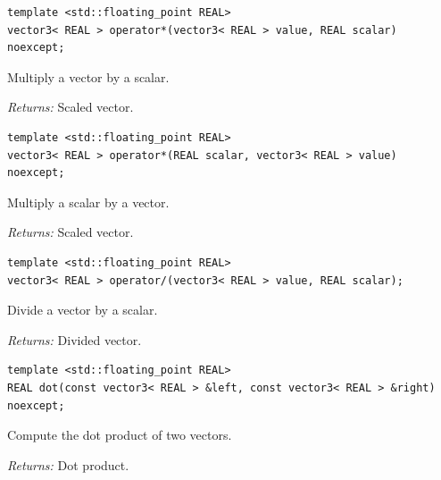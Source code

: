 \par\noindent\begin{minipage}{\linewidth}
\begin{lstlisting}[style=apireference]
template <std::floating_point REAL>
vector3< REAL > operator*(vector3< REAL > value, REAL scalar) noexcept;
\end{lstlisting}
{\footnotesize Multiply a vector by a scalar.\par}
{\footnotesize\textit{Returns:} Scaled vector.\par}
\end{minipage}\par\vspace{1pt}
\par\noindent\begin{minipage}{\linewidth}
\begin{lstlisting}[style=apireference]
template <std::floating_point REAL>
vector3< REAL > operator*(REAL scalar, vector3< REAL > value) noexcept;
\end{lstlisting}
{\footnotesize Multiply a scalar by a vector.\par}
{\footnotesize\textit{Returns:} Scaled vector.\par}
\end{minipage}\par\vspace{1pt}
\par\noindent\begin{minipage}{\linewidth}
\begin{lstlisting}[style=apireference]
template <std::floating_point REAL>
vector3< REAL > operator/(vector3< REAL > value, REAL scalar);
\end{lstlisting}
{\footnotesize Divide a vector by a scalar.\par}
{\footnotesize\textit{Returns:} Divided vector.\par}
\end{minipage}\par\vspace{1pt}
\par\noindent\begin{minipage}{\linewidth}
\begin{lstlisting}[style=apireference]
template <std::floating_point REAL>
REAL dot(const vector3< REAL > &left, const vector3< REAL > &right) noexcept;
\end{lstlisting}
{\footnotesize Compute the dot product of two vectors.\par}
{\footnotesize\textit{Returns:} Dot product.\par}
\end{minipage}\par\vspace{1pt}
